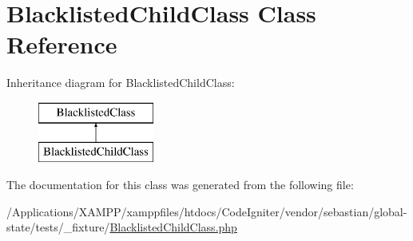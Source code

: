 \hypertarget{class_sebastian_bergmann_1_1_global_state_1_1_test_fixture_1_1_blacklisted_child_class}{}\section{Blacklisted\+Child\+Class Class Reference}
\label{class_sebastian_bergmann_1_1_global_state_1_1_test_fixture_1_1_blacklisted_child_class}
Inheritance diagram for Blacklisted\+Child\+Class\+:\begin{figure}[H]
\begin{center}
\leavevmode
\includegraphics[height=2.000000cm]{class_sebastian_bergmann_1_1_global_state_1_1_test_fixture_1_1_blacklisted_child_class}
\end{center}
\end{figure}


The documentation for this class was generated from the following file\+:\begin{DoxyCompactItemize}
\item 
/\+Applications/\+X\+A\+M\+P\+P/xamppfiles/htdocs/\+Code\+Igniter/vendor/sebastian/global-\/state/tests/\+\_\+fixture/\mbox{\hyperlink{_blacklisted_child_class_8php}{Blacklisted\+Child\+Class.\+php}}\end{DoxyCompactItemize}
